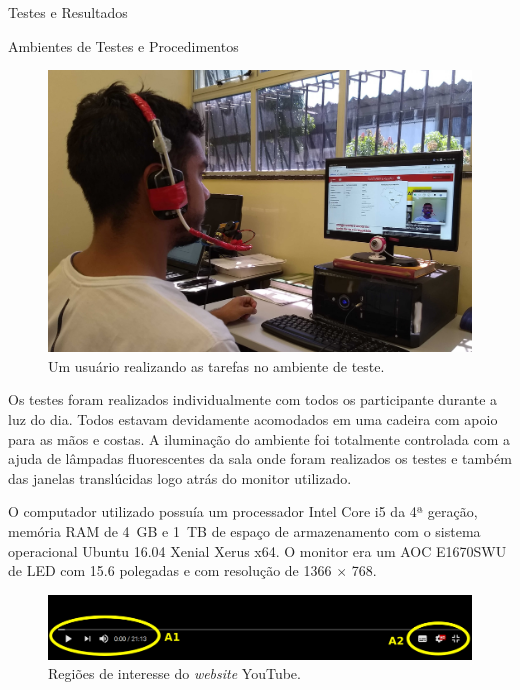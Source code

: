 \begin{chapter}{Testes e Resultados}
\begin{section}{Ambientes de Testes e Procedimentos}
\begin{figure}[!h]
	\centering
	\includegraphics[width=1.00\linewidth]{fig/denes}
	\caption{Um usuário realizando as tarefas no ambiente de teste.}
	\label{fig:ambiente}
\end{figure}

Os testes foram realizados individualmente com todos os participante durante a
luz do dia. Todos estavam devidamente acomodados em uma cadeira com apoio para
as mãos e costas. A iluminação do ambiente foi totalmente controlada com a ajuda
de lâmpadas fluorescentes da sala onde foram realizados os testes e também das 
janelas translúcidas logo atrás do monitor utilizado. 

O computador utilizado possuía um processador Intel Core i5 da 4ª geração,
memória RAM de 4~GB e 1~TB de espaço de armazenamento com o sistema operacional
Ubuntu 16.04 Xenial Xerus x64. O monitor era um AOC E1670SWU de LED com 15.6
polegadas e com resolução de 1366 $\times$ 768.

\begin{figure}[!h]
	\centering
	\includegraphics[width=1.00\linewidth]{fig/YT}
	\caption{Regiões de interesse do \textit{website} YouTube.}
	\label{fig:youtube}
\end{figure}


\end{section}
\end{chapter}
